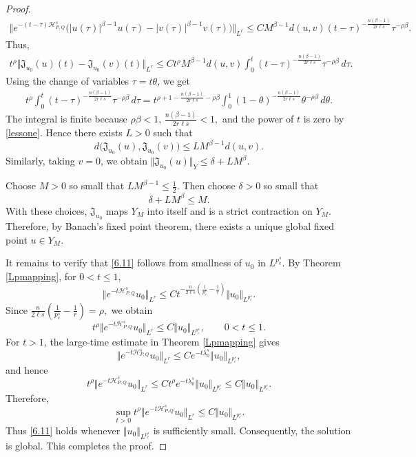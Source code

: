 \documentclass[10pt,a4paper]{amsart}
\newcommand{\APQ}{\mathcal{H}_{P, Q}}
\begin{document}
\begin{proof}
\[
\begin{aligned}
\Vert
e^{-(t-\tau)\APQ^s}
\big(
|u(\tau)|^{\beta-1}u(\tau)
-
|v(\tau)|^{\beta-1}v(\tau)
\big)
\Vert_{L^r}
\leq
C
M^{\beta-1}
d(u,v)
(t-\tau)^{-\frac{n(\beta-1)}{2r\ell s}}
\tau^{-\rho\beta}.
\end{aligned}
\]
Thus,
\[
\begin{aligned}
t^\rho
\Vert
\mathfrak J_{u_0}(u)(t)
-
\mathfrak J_{u_0}(v)(t)
\Vert_{L^r}
\leq
C
t^\rho
M^{\beta-1}
d(u,v)
\int_0^t
(t-\tau)^{-\frac{n(\beta-1)}{2r\ell s}}
\tau^{-\rho\beta}
\,d\tau.
\end{aligned}
\]
Using the change of variables $\tau=t\theta$, we get
\[
\begin{aligned}
t^\rho
\int_0^t
(t-\tau)^{-\frac{n(\beta-1)}{2r\ell s}}
\tau^{-\rho\beta}
\,d\tau
=
t^{
\rho+1
-\frac{n(\beta-1)}{2r\ell s}
-\rho\beta
}
\int_0^1
(1-\theta)^{-\frac{n(\beta-1)}{2r\ell s}}
\theta^{-\rho\beta}
\,d\theta.
\end{aligned}
\]
The integral is finite because $ \rho\beta<1,\,
    \frac{n(\beta-1)}{2r\ell s}<1,$
and the power of $t$ is zero by \eqref{lessone}. Hence there exists $L>0$ such that
\begin{equation}
\label{criticalcontraction}
    d\big(\mathfrak J_{u_0}(u),\mathfrak J_{u_0}(v)\big)
    \leq
    L M^{\beta-1}d(u,v).
\end{equation}
Similarly, taking $v=0$, we obtain
$\Vert \mathfrak J_{u_0}(u)\Vert_Y
    \leq \delta + L M^\beta.$

Choose $M>0$ so small that $L M^{\beta-1}\leq \frac12.$
Then choose $\delta>0$ so small that
\[
    \delta+L M^\beta\leq M.
\]
With these choices, $\mathfrak J_{u_0}$ maps $Y_M$ into itself and is a strict contraction on $Y_M$. Therefore, by Banach's fixed point theorem, there exists a unique global fixed point $u\in Y_M$.

It remains to verify that \eqref{6.11} follows from smallness of $u_0$ in $L^{p_c^s}$. By Theorem \ref{Lpmapping}, for $0<t\leq1$,
\[
    \Vert e^{-t\APQ^s}u_0\Vert_{L^r}
    \leq
    C
    t^{-\frac{n}{2\ell s}
    \left(
    \frac1{p_c^s}-\frac1r
    \right)}
    \Vert u_0\Vert_{L^{p_c^s}}.
\]
Since $\frac{n}{2\ell s}
    \left(
    \frac1{p_c^s}-\frac1r
    \right)  =
    \rho,$
we obtain
\[
    t^\rho
    \Vert e^{-t\APQ^s}u_0\Vert_{L^r}
    \leq
    C
    \Vert u_0\Vert_{L^{p_c^s}},
    \qquad 0<t\leq1.
\]
For $t>1$, the large-time estimate in Theorem \ref{Lpmapping} gives
\[
    \Vert e^{-t\APQ^s}u_0\Vert_{L^r}
    \leq
    C e^{-t\lambda_0^s}
    \Vert u_0\Vert_{L^{p_c^s}},
\]
and hence
\[
    t^\rho
    \Vert e^{-t\APQ^s}u_0\Vert_{L^r}
    \leq
    C
    t^\rho e^{-t\lambda_0^s}
    \Vert u_0\Vert_{L^{p_c^s}}
    \leq
    C
    \Vert u_0\Vert_{L^{p_c^s}}.
\]
Therefore,
\[
    \sup_{t>0}
    t^\rho
    \Vert e^{-t\APQ^s}u_0\Vert_{L^r}
    \leq
    C
    \Vert u_0\Vert_{L^{p_c^s}}.
\]
Thus \eqref{6.11} holds whenever $\Vert u_0\Vert_{L^{p_c^s}}$ is sufficiently small. Consequently, the solution is global. This completes the proof.
\end{proof}
\end{document}
